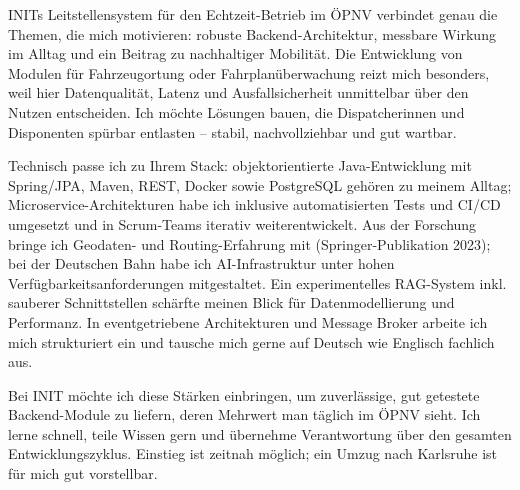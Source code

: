 INITs Leitstellensystem für den Echtzeit-Betrieb im ÖPNV verbindet genau die Themen, die mich motivieren: robuste Backend-Architektur, messbare Wirkung im Alltag und ein Beitrag zu nachhaltiger Mobilität. Die Entwicklung von Modulen für Fahrzeugortung oder Fahrplanüberwachung reizt mich besonders, weil hier Datenqualität, Latenz und Ausfallsicherheit unmittelbar über den Nutzen entscheiden. Ich möchte Lösungen bauen, die Dispatcherinnen und Disponenten spürbar entlasten – stabil, nachvollziehbar und gut wartbar.

Technisch passe ich zu Ihrem Stack: objektorientierte Java-Entwicklung mit Spring/JPA, Maven, REST, Docker sowie PostgreSQL gehören zu meinem Alltag; Microservice-Architekturen habe ich inklusive automatisierten Tests und CI/CD umgesetzt und in Scrum-Teams iterativ weiterentwickelt. Aus der Forschung bringe ich Geodaten- und Routing-Erfahrung mit (Springer-Publikation 2023); bei der Deutschen Bahn habe ich AI-Infrastruktur unter hohen Verfügbarkeitsanforderungen mitgestaltet. Ein experimentelles RAG-System inkl. sauberer Schnittstellen schärfte meinen Blick für Datenmodellierung und Performanz. In eventgetriebene Architekturen und Message Broker arbeite ich mich strukturiert ein und tausche mich gerne auf Deutsch wie Englisch fachlich aus.

Bei INIT möchte ich diese Stärken einbringen, um zuverlässige, gut getestete Backend-Module zu liefern, deren Mehrwert man täglich im ÖPNV sieht. Ich lerne schnell, teile Wissen gern und übernehme Verantwortung über den gesamten Entwicklungszyklus. Einstieg ist zeitnah möglich; ein Umzug nach Karlsruhe ist für mich gut vorstellbar.